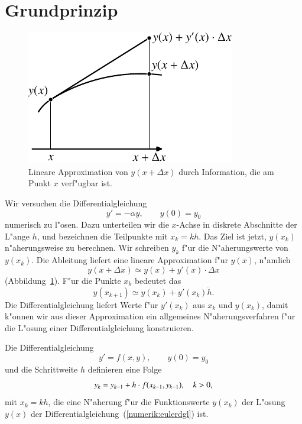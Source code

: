 \section{Grundprinzip}
\begin{figure}
\centering
\includegraphics{chapters/images/numerik-2.pdf}
\caption{Lineare Approximation von $y(x+\Delta x)$ durch Information,
die am Punkt $x$ verf"ugbar ist.
\label{numerik:lineareapproximation}}
\end{figure}
Wir versuchen die Differentialgleichung
\begin{equation}
y'=-\alpha y,\qquad y(0)=y_0
\label{numerik:expdgl}
\end{equation}
numerisch zu l"osen. 
Dazu unterteilen wir die $x$-Achse in diskrete Abschnitte der L"ange $h$,
und bezeichnen die Teilpunkte mit $x_k=kh$.
Das Ziel ist jetzt, $y(x_k)$ n"aherungsweise zu berechnen.
Wir schreiben $y_k$ f"ur die N"aherungswerte von $y(x_k)$.
Die Ableitung liefert eine lineare Approximation f"ur $y(x)$,
n"amlich
\[
y(x+\Delta x)\simeq y(x) + y'(x)\cdot\Delta x
\]
(Abbildung~\ref{numerik:lineareapproximation}).
F"ur die Punkte $x_k$ bedeutet das
\[
y(x_{k+1})\simeq y(x_{k})+y'(x_k)\dot h.
\]
Die Differentialgleichung liefert Werte f"ur $y'(x_k)$ aus $x_k$ und $y(x_k)$,
damit k"onnen wir aus dieser Approximation ein allgemeines
N"aherungsverfahren f"ur die L"osung einer Differentialgleichung
konstruieren.

\begin{satz}
Die Differentialgleichung
\begin{equation}
y'=f(x,y),\qquad y(0)=y_0
\label{numerik:eulerdgl}
\end{equation}
und die Schrittweite $h$ definieren eine Folge 
\[
y_{\mathstrut k}=y_{k-1} + h\cdot f(x_{k-1}, y_{k-1}),\quad k>0,
\]
mit $x_k=kh$,
die eine N"aherung f"ur die Funktionswerte $y(x_k)$ der L"osung $y(x)$
der Differentialgleichung~(\ref{numerik:eulerdgl}) ist.
\end{satz}

